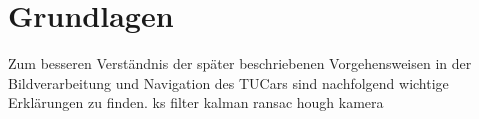 \chapter{Grundlagen}
Zum besseren Verständnis der später beschriebenen Vorgehensweisen in der Bildverarbeitung und Navigation des TUCars sind nachfolgend wichtige Erklärungen zu finden.
{ks}
{filter}
{kalman}
{ransac}
{hough}
{kamera}
